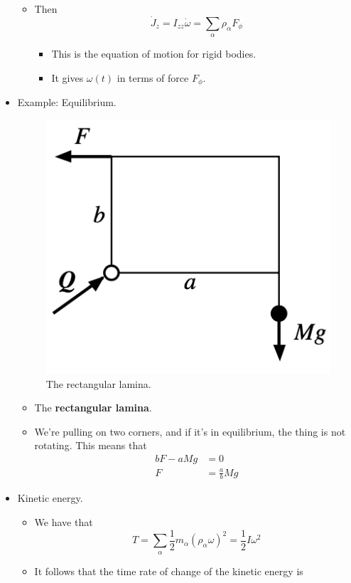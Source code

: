 \documentclass[../notes.tex]{subfiles}
\begin{document}
\begin{itemize}
\begin{itemize}
\begin{equation*}
        \end{equation*}
        \item Then
        \begin{equation*}
            \dot{J}_z = I_{zz}\dot{\omega}
            = \sum_\alpha\rho_\alpha F_\phi
        \end{equation*}
        \begin{itemize}
            \item This is the equation of motion for rigid bodies.
            \item It gives $\omega(t)$ in terms of force $F_\phi$.
        \end{itemize}
    \end{itemize}
    \item Example: Equilibrium.
    \begin{figure}[h!]
        \centering
        \includegraphics[width=0.22\linewidth]{../ExtFiles/rectangularLamina.png}
        \caption{The rectangular lamina.}
        \label{fig:rectangularLamina}
    \end{figure}
    \begin{itemize}
        \item The \textbf{rectangular lamina}.
        \item We're pulling on two corners, and if it's in equilibrium, the thing is not rotating. This means that
        \begin{align*}
            bF-aMg &= 0\\
            F &= \frac{a}{b}Mg
        \end{align*}
    \end{itemize}
    \item Kinetic energy.
    \begin{itemize}
        \item We have that
        \begin{equation*}
            T = \sum_\alpha\frac{1}{2}m_\alpha(\rho_\alpha\omega)^2
            = \frac{1}{2}I\omega^2
        \end{equation*}
        \item It follows that the time rate of change of the kinetic energy is
        \begin{equation*}

\end{equation*}
\end{itemize}
\end{itemize}
\end{document}
